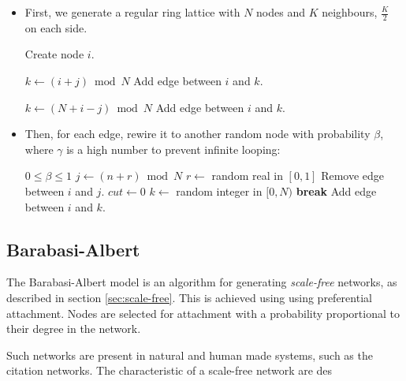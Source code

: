 \documentclass[a4paper,11pt,titlepage]{article}
\begin{document}
\begin{itemize}

\item
  First, we generate a regular ring lattice with $N$ nodes and $K$ neighbours,
  $\frac{K}{2}$ on each side.

  \begin{algorithmic}
      \STATE Create node $i$.
    \ENDFOR

        \STATE $k \gets (i + j) \bmod{N}$
        \STATE Add edge between $i$ and $k$.
      \ENDFOR

        \STATE $k \gets (N + i - j) \bmod{N}$
        \STATE Add edge between $i$ and $k$.
      \ENDFOR
    \ENDFOR
  \end{algorithmic}

\item
  Then, for each edge, rewire it to another random node with probability
  $\beta$, where $\gamma$ is a high number to prevent infinite looping:

  \begin{algorithmic}
    \REQUIRE $0 \leq \beta \leq 1$
        \STATE $j \gets (n + r) \bmod{N}$
        \STATE $r \gets$ random real in $[0, 1]$
          \STATE Remove edge between $i$ and $j$.
          \STATE $cut \gets 0$
            \STATE $k \gets$ random integer in $[0, N)$
              \STATE \textbf{break}
            \ELSE
              \STATE Add edge between $i$ and $k$.
            \ENDIF
          \ENDFOR
        \ENDIF
      \ENDFOR
    \ENDFOR
  \end{algorithmic}
\end{itemize}

\subsection{Barabasi-Albert}
The Barabasi-Albert model is an algorithm for generating \emph{scale-free}
networks, as described in section \ref{sec:scale-free}. This is achieved using
using preferential attachment. Nodes are selected for attachment with a
probability proportional to their degree in the network.

Such networks are present in natural and human made systems, such as the
citation networks. The characteristic of a scale-free network are des
\end{document}
